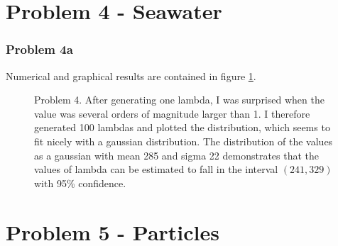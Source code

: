 \documentclass[a4paper,11pt]{article}
\begin{document}
\section{Problem 4 - Seawater}
\subsubsection{Problem 4a}
Numerical and graphical results are contained in figure \ref{p4_seawater}.


\begin{figure}[H]
  \centering
  \caption{Problem 4.
  After generating one lambda, I was surprised when the value was several orders of magnitude larger than 1.
  I therefore generated 100 lambdas and plotted the distribution, which seems to fit nicely with a gaussian distribution.
The distribution of the values as a gaussian with mean 285 and sigma 22 demonstrates that the values of lambda can be estimated to fall in the interval $(241, 329)$ with 95\% confidence. }
  \label{p4_seawater}
\end{figure}

\section{Problem 5 - Particles}
\end{document}
